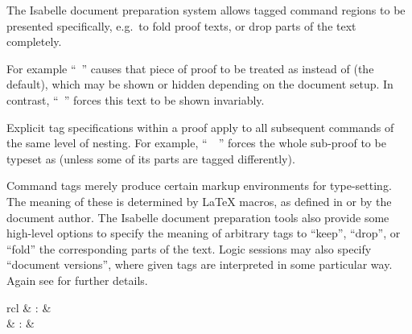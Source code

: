 \begin{isabellebody}
\begin{isamarkuptext}
  \medskip The Isabelle document preparation system
  \cite{isabelle-sys} allows tagged command regions to be presented
  specifically, e.g.\ to fold proof texts, or drop parts of the text
  completely.

  For example ``\hyperlink{command.by}{\mbox{}}~'' causes
  that piece of proof to be treated as  instead of
   (the default), which may be shown or hidden
  depending on the document setup.  In contrast, ``\hyperlink{command.by}{\mbox{}}~'' forces this text to be shown
  invariably.

  Explicit tag specifications within a proof apply to all subsequent
  commands of the same level of nesting.  For example, ``\hyperlink{command.proof}{\mbox{}}~~\hyperlink{command.qed}{\mbox{}}'' forces the whole
  sub-proof to be typeset as  (unless some of its parts
  are tagged differently).

  \medskip Command tags merely produce certain markup environments for
  type-setting.  The meaning of these is determined by {\LaTeX}
  macros, as defined in \hyperlink{file.~~/lib/texinputs/isabelle.sty}{\mbox{}} or
  by the document author.  The Isabelle document preparation tools
  also provide some high-level options to specify the meaning of
  arbitrary tags to ``keep'', ``drop'', or ``fold'' the corresponding
  parts of the text.  Logic sessions may also specify ``document
  versions'', where given tags are interpreted in some particular way.
  Again see \cite{isabelle-sys} for further details.%
\end{isamarkuptext}%
\isamarkuptrue%
%
\isamarkuptrue%
%
\begin{isamarkuptext}%
\begin{matharray}{rcl}
    \hypertarget{command.display-drafts}{\hyperlink{command.display-drafts}{\mbox{}}}\isa{{\isachardoublequote}\isactrlsup {\isacharasterisk}{\isachardoublequote}} & : &  \\
    \hypertarget{command.print-drafts}{\hyperlink{command.print-drafts}{\mbox{}}}\isa{{\isachardoublequote}\isactrlsup {\isacharasterisk}{\isachardoublequote}} & : &  \\
  \end{matharray}


\end{isamarkuptext}
\end{isabellebody}
